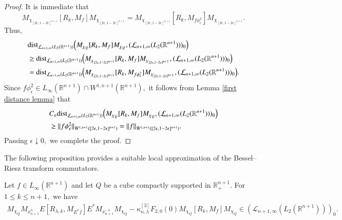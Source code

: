 \documentclass[12pt]{amsart}
\begin{document}
\begin{proof}
It is immediate that
$$M_{\chi_{[2\epsilon,1-2\epsilon]^{n+1}}}[R_k,M_f]M_{\chi_{[2\epsilon,1-2\epsilon]^{n+1}}}=M_{\chi_{[2\epsilon,1-2\epsilon]^{n+1}}}[R_k,M_{f\phi_{\epsilon}^2}]M_{\chi_{[2\epsilon,1-2\epsilon]^{n+1}}}.$$
Thus,
\begin{align*}
&{\rm dist}_{\mathcal{L}_{n+1,\infty}(L_2(\mathbb{R}^{n+1}))}\Big(M_{\chi_Q}[R_k,M_f]M_{\chi_Q},(\mathcal{L}_{n+1,\infty}(L_2(\mathbb{R}^{n+1})))_0\Big)\\
&\geq {\rm dist}_{\mathcal{L}_{n+1,\infty}(L_2(\mathbb{R}^{n+1}))}\Big(M_{\chi_{[2\epsilon,1-2\epsilon]^{n+1}}}[R_k,M_f]M_{\chi_{[2\epsilon,1-2\epsilon]^{n+1}}},(\mathcal{L}_{n+1,\infty}(L_2(\mathbb{R}^{n+1})))_0\Big)\\
&={\rm dist}_{\mathcal{L}_{n+1,\infty}(L_2(\mathbb{R}^{n+1}))}\Big(M_{\chi_{[2\epsilon,1-2\epsilon]^{n+1}}}[R_k,M_{f\phi_{\epsilon}^2}]M_{\chi_{[2\epsilon,1-2\epsilon]^{n+1}}},(\mathcal{L}_{n+1,\infty}(L_2(\mathbb{R}^{n+1})))_0\Big).
\end{align*}
Since $f\phi_{\epsilon}^2\in L_{\infty}(\mathbb{R}^{n+1})\cap W^{1,n+1}(\mathbb{R}^{n+1}),$ it follows from Lemma \ref{first distance lemma} that
\begin{align*}
&C_n{\rm dist}_{\mathcal{L}_{n+1,\infty}(L_2(\mathbb{R}^{n+1}))}\Big(M_{\chi_Q}[R_k,M_f]M_{\chi_Q},(\mathcal{L}_{n+1,\infty}(L_2(\mathbb{R}^{n+1})))_0\Big)\\
&\geq \|f\phi_{\epsilon}^2\|_{\dot{W}^{1,n+1}([2\epsilon,1-2\epsilon]^{n+1})}=\|f\|_{\dot{W}^{1,n+1}([2\epsilon,1-2\epsilon]^{n+1})}.
\end{align*}
Passing $\epsilon\downarrow0,$ we complete the proof.
\end{proof}
%
The following proposition provides a suitable local approximation of the Bessel--Riesz transform commutators.
\begin{proposition}\label{mtb main lemma} Let $f\in L_{\infty}(\mathbb{R}^{n+1})$ and let $Q$ be a cube compactly supported in $\mathbb{R}^{n+1}_+.$ For $1\leq k\leq n+1,$ we have
\begin{align*}
M_{\chi_Q}M_{x_{n+1}^{\lambda}}E[R_{\lambda,k},M_{E^{\ast}f}]E^{\ast}M_{x_{n+1}^{-\lambda}}M_{\chi_Q}-\kappa^{[3]}_{n,\lambda}F_{2,0}(0)M_{\chi_Q}[R_k,M_f]M_{\chi_Q}\in (\mathcal{L}_{n+1,\infty}(L_2(\mathbb{R}^{n+1})))_0.
\end{align*}
\end{proposition}
\end{document}
